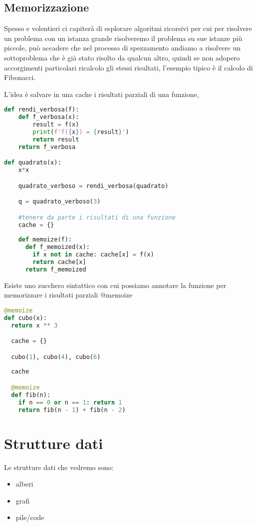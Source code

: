 \subsection{Memorizzazione}
Spesso e volentieri ci capiterà di esplorare algoritmi ricorsivi per cui per risolvere un problema con un istanza grande risolveremo il problema su sue istanze più piccole, può accadere che nel processo di spezzamento andiamo a risolvere un sottoproblema che è già stato risolto da qualcun altro, quindi se non adopero accorgimenti particolari ricalcolo gli stessi risultati, l'esempio tipico è il calcolo di Fibonacci.

L'idea è salvare in una cache i risultati parziali di una funzione,

\begin{lstlisting}[language=Python]
def rendi_verbosa(f):
    def f_verbosa(x):
        result = f(x)
        print(f'f({x}) = {result}')
        return result
    return f_verbosa

def quadrato(x):
    x*x

    quadrato_verboso = rendi_verbosa(quadrato)

    q = quadrato_verboso(3)

    #tenere da parte i risultati di una funzione
    cache = {}
    
    def memoize(f):
      def f_memoized(x):
        if x not in cache: cache[x] = f(x)
        return cache[x]
      return f_memoized
\end{lstlisting}
Esiste uno zucchero sintattico con cui possiamo annotare la funzione per memorizzare i risultati parziali @memoize

\begin{lstlisting}[language=Python]
@memoize 
def cubo(x):
  return x ** 3

  cache = {}

  cubo(1), cubo(4), cubo(6)
  
  cache

  @memoize
  def fib(n):
    if n == 0 or n == 1: return 1
    return fib(n - 1) + fib(n - 2)
\end{lstlisting}

\section{Strutture dati}
Le strutture dati che vedremo sono:
\begin{itemize}
    \item alberi
    \item grafi
    \item pile/code
\end{itemize}

